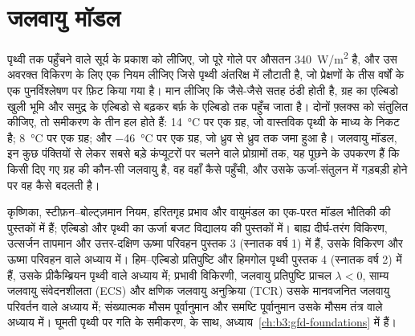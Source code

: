 \chapter{जलवायु मॉडल}\label{ch:b3:climate-models}

पृथ्वी तक पहुँचने वाले सूर्य के प्रकाश को लीजिए, जो पूरे गोले पर औसतन \qty{340}{W/m^2} है,
और उस अवरक्त विकिरण के लिए एक नियम लीजिए जिसे पृथ्वी अंतरिक्ष में लौटाती है,
जो प्रेक्षणों के तीस वर्षों के एक पुनर्विश्लेषण पर फ़िट किया गया है। मान लीजिए कि
जैसे-जैसे सतह ठंडी होती है, ग्रह का एल्बिडो खुली भूमि और समुद्र के एल्बिडो से
बढ़कर बर्फ़ के एल्बिडो तक पहुँच जाता है। दोनों फ़्लक्स को संतुलित कीजिए, तो
समीकरण के तीन हल होते हैं: \qty{14}{\celsius} पर एक ग्रह, जो वास्तविक पृथ्वी के
माध्य के निकट है; \qty{8}{\celsius} पर एक ग्रह; और \qty{-46}{\celsius} पर एक ग्रह,
जो ध्रुव से ध्रुव तक जमा हुआ है। जलवायु मॉडल, इन कुछ पंक्तियों से लेकर
सबसे बड़े कंप्यूटरों पर चलने वाले प्रोग्रामों तक, यह पूछने के उपकरण हैं कि किसी दिए गए
ग्रह की कौन-सी जलवायु है, वह वहाँ कैसे पहुँची, और उसके ऊर्जा-संतुलन में गड़बड़ी होने पर वह कैसे बदलती है।

\begin{recall}
कृष्णिका, स्टीफ़न--बोल्ट्ज़मान नियम, हरितगृह प्रभाव और
वायुमंडल का एक-परत मॉडल भौतिकी की पुस्तकों में हैं; एल्बिडो और
पृथ्वी का ऊर्जा बजट विद्यालय की पुस्तकों में। बाह्य दीर्घ-तरंग
विकिरण, उत्सर्जन तापमान और उत्तर-दक्षिण ऊष्मा परिवहन पुस्तक 3 (स्नातक वर्ष 1) में हैं,
उसके विकिरण और ऊष्मा परिवहन वाले अध्याय में। हिम--एल्बिडो प्रतिपुष्टि और
हिमगोल पृथ्वी पुस्तक 4 (स्नातक वर्ष 2) में हैं, उसके
प्रीकैम्ब्रियन पृथ्वी वाले अध्याय में; प्रभावी विकिरणी,
जलवायु प्रतिपुष्टि प्राचल $\lambda < 0$, साम्य जलवायु संवेदनशीलता
(ECS) और क्षणिक जलवायु अनुक्रिया (TCR) उसके
मानवजनित जलवायु परिवर्तन वाले अध्याय में; संख्यात्मक मौसम पूर्वानुमान और
समष्टि पूर्वानुमान उसके मौसम तंत्र वाले अध्याय में। घूमती पृथ्वी पर गति के
समीकरण,  के साथ,
अध्याय~\ref{ch:b3:gfd-foundations} में हैं।
\end{recall}


